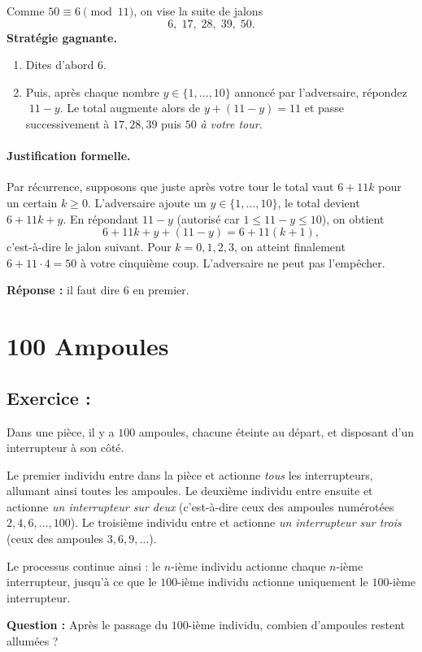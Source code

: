 Comme \(50 \equiv 6 \pmod{11}\), on vise la suite de jalons
\[
6,\;17,\;28,\;39,\;50 .
\]
\textbf{Stratégie gagnante.}
\begin{enumerate}
  \item Dites d'abord \(\boxed{6}\).
  \item Puis, après chaque nombre \(y\in\{1,\dots,10\}\) annoncé par l'adversaire,
        répondez \(\;11-y\). Le total augmente alors de \(y+(11-y)=11\)
        et passe successivement à \(17, 28, 39\) puis \(50\) \emph{à votre tour}.
\end{enumerate}

\paragraph{Justification formelle.}
Par récurrence, supposons que juste après votre tour le total vaut \(6+11k\)
pour un certain \(k\ge 0\). L'adversaire ajoute un \(y\in\{1,\dots,10\}\),
le total devient \(6+11k+y\). En répondant \(11-y\) (autorisé car
\(1\le 11-y\le 10\)), on obtient
\[
6+11k+y+(11-y)=6+11(k+1),
\]
c'est-à-dire le jalon suivant. Pour \(k=0,1,2,3\), on atteint finalement
\(6+11\cdot 4=50\) à votre cinquième coup. L'adversaire ne peut pas l'empêcher.

\medskip
\noindent\textbf{Réponse :} il faut dire \(\boxed{6}\) en premier.


\section{100 Ampoules}

\subsection*{Exercice :}

\begin{exerciseBox}[100 Ampoules]
Dans une pièce, il y a $100$ ampoules, chacune éteinte au départ, et disposant d’un interrupteur à son côté.

Le premier individu entre dans la pièce et actionne \textit{tous} les interrupteurs, allumant ainsi toutes les ampoules.
Le deuxième individu entre ensuite et actionne \textit{un interrupteur sur deux} (c’est-à-dire ceux des ampoules numérotées $2, 4, 6, \ldots, 100$).  
Le troisième individu entre et actionne \textit{un interrupteur sur trois} (ceux des ampoules $3, 6, 9, \ldots$).  

Le processus continue ainsi : le $n$-ième individu actionne chaque $n$-ième interrupteur, jusqu’à ce que le $100$-ième individu actionne uniquement le $100$-ième interrupteur.

\medskip
\textbf{Question :} Après le passage du $100$-ième individu, combien d’ampoules restent allumées ?
\end{exerciseBox}

